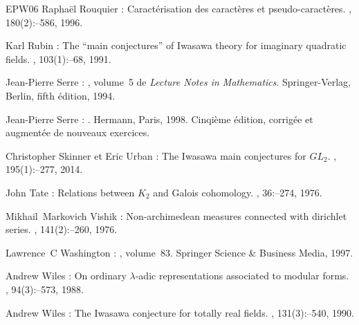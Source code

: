 \documentclass[12pt]{amsart}
\theoremstyle{defstyle}
\theoremstyle{thmstyle}
\begin{document}
\begin{thebibliography}{EPW06}
Rapha{\"e}l \bgroup\fonteauteurs\bgroup Rouquier\egroup\egroup{} :
\newblock Caract{\'e}risation des caract{\`e}res et pseudo-caract{\`e}res.
, 180(2)\string:--586,
  1996.

Karl \bgroup\fonteauteurs\bgroup Rubin\egroup\egroup{} :
\newblock The ``main conjectures'' of {I}wasawa theory for imaginary
  quadratic fields.
, 103(1)\string:--68, 1991.

Jean-Pierre \bgroup\fonteauteurs\bgroup Serre\egroup\egroup{} :
, volume~5 de {\em Lecture Notes in
  Mathematics}.
\newblock Springer-Verlag, Berlin, fifth \'edition, 1994.

Jean-Pierre \bgroup\fonteauteurs\bgroup Serre\egroup\egroup{} :
.
\newblock Hermann, Paris, 1998.
\newblock Cinqi\`eme \'{e}dition, corrig\'ee et augment\'ee de nouveaux
  exercices.

Christopher \bgroup\fonteauteurs\bgroup Skinner\egroup\egroup{} et Eric
  \bgroup\fonteauteurs\bgroup Urban\egroup\egroup{} :
\newblock The {I}wasawa main conjectures for {$GL_2$}.
, 195(1)\string:--277, 2014.

John \bgroup\fonteauteurs\bgroup Tate\egroup\egroup{} :
\newblock Relations between {$K_{2}$} and {G}alois cohomology.
, 36\string:--274, 1976.

Mikhail~Markovich \bgroup\fonteauteurs\bgroup Vishik\egroup\egroup{} :
\newblock Non-archimedean measures connected with dirichlet series.
, 141(2)\string:--260, 1976.

Lawrence~C \bgroup\fonteauteurs\bgroup Washington\egroup\egroup{} :
, volume~83.
\newblock Springer Science \& Business Media, 1997.

Andrew \bgroup\fonteauteurs\bgroup Wiles\egroup\egroup{} :
\newblock On ordinary $\lambda$-adic representations associated to modular
  forms.
, 94(3)\string:--573, 1988.

Andrew \bgroup\fonteauteurs\bgroup Wiles\egroup\egroup{} :
\newblock The {I}wasawa conjecture for totally real fields.
, 131(3)\string:--540,
  1990.

\end{thebibliography}
\end{document}
